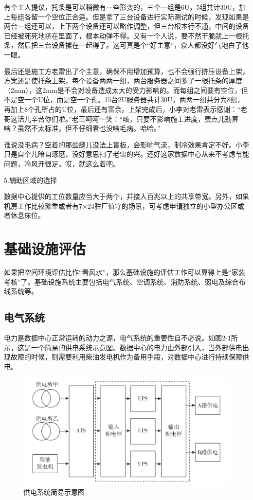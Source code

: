 \documentclass[12pt,UTF8]{ctexbook}
\begin{document}
有个工人提议，托条是可以稍微有一些形变的，三个一组是6U，5组共计30U，加上每组各留一个空位正合适。但是拿了三台设备进行实际测试的时候，发现如果是两台一组还可以，上下两个设备还可以略作调整，但三台根本行不通，中间的设备已经被死死地挤在里面了，根本动弹不得。又有一个人说，要不然干脆就上一根托条，然后把三台设备摞在一起得了。这可真是个“好主意”，众人都没好气地白了他一眼。

最后还是施工方老雷出了个主意，确保不用增加预算，也不会强行挤压设备上架，方案还是使托条上架，每个设备两两一组，两台服务器之间多了一根托条的厚度（2mm），这2mm是不会对设备造成太大的受力影响的。而每组之间要有空位，但不是空一个U位，而是空一个孔。15台2U服务器共计30U，两两一组共分为8组，再加上8个孔所占的U位，最后还有富余。上架完成后，小李对老雷表示感谢：“老哥这活儿辛苦你们啦。”老王呵呵一笑：“咳，只要不影响施工进度，费点儿劲算啥？虽然不太标准，但不仔细看也没啥毛病。哈哈。”

谁说没毛病？空着的那些缝儿没法上盲板，会影响气流，制冷效果肯定不好。小李只是自个儿暗自琢磨，没好意思扫了老雷的兴。还好这家数据中心从来不考虑节能问题，冷风开很足。哎，就这么着吧。

5.辅助区域的选择

数据中心提供的工位数量应当大于两个，并接入百兆以上的共享带宽。另外，如果机房工作比较繁重或者有7×24驻厂值守的场景，可考虑申请独立的小型办公区或者休息床位。

\section{基础设施评估}

如果把空间环境评估比作“看风水”，那么基础设施的评估工作可以算得上是“家装考核”了。基础设施系统主要包括电气系统、空调系统、消防系统、弱电及综合布线系统等。

\subsection{电气系统}

电力是数据中心正常运转的动力之源，电气系统的重要性自不必说。如图2-1所示，这是一个简易的供电系统示意图。数据中心的电力由外部引入，当外部供电出现故障的时候，则需要利用柴油发电机作为备用手段，对数据中心进行持续保障供电。

\begin{figure}[htbp]
	\centering
	\includegraphics[width=1\linewidth]{1}
	\caption{供电系统简易示意图}
	\label{fig:1}
\end{figure}
\end{document}
